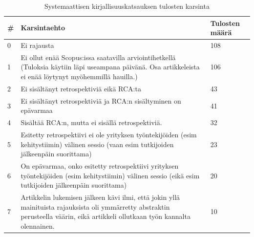 \begin{table}
    \begin{tabular}{|p{0.5cm}|p{11.5cm}|p{2cm}|}
        \hline
        \textbf{\#} & \textbf{Karsintaehto} & \textbf{Tulosten määrä} \\ \hline
        0 & Ei rajausta                                                                                                                                               & 108            \\ \hline
        1 & Ei ollut enää Scopus:issa saatavilla arviointihetkellä (Tuloksia käytiin läpi useampana päivänä. Osa artikkeleista ei enää löytynyt myöhemmillä hauilla.) & 106            \\ \hline
        2 & Ei sisältänyt retrospektiviä eikä RCA:ta                                                                                                                          & 43             \\ \hline
        3 & Ei sisältänyt retrospektiviä ja RCA:n sisältyminen on epävarmaa                                                                                                   & 41             \\ \hline
        4 & Sisältää RCA:n, mutta ei sisällä retrospektiviä.                                                                                                                  & 32             \\ \hline
        5 & Esitetty retrospektiivi ei ole yrityksen työntekijöiden (esim kehitystiimin) välinen sessio (vaan esim tutkijoiden jälkeenpäin suorittama)                & 23             \\ \hline
        6 & On epävarmaa, onko esitetty retrospektiivi yrityksen työntekijöiden (esim kehitystiimin) välinen sessio (eikä esim tutkijoiden jälkeenpäin suorittama)    & 20             \\
        \hline
        7 & Artikkelin lukemisen jälkeen kävi ilmi, että jokin yllä mainituista rajauksista oli ymmärretty abstraktin perusteella väärin, eikä artikkeli ollutkaan työn kannalta olennainen. & 10 \\ \hline
    \end{tabular}
    \caption{Systemaattisen kirjallisuuskatsauksen tulosten karsinta}
    \label{tab:karsintaehdot_taulukko}
\end{table}

